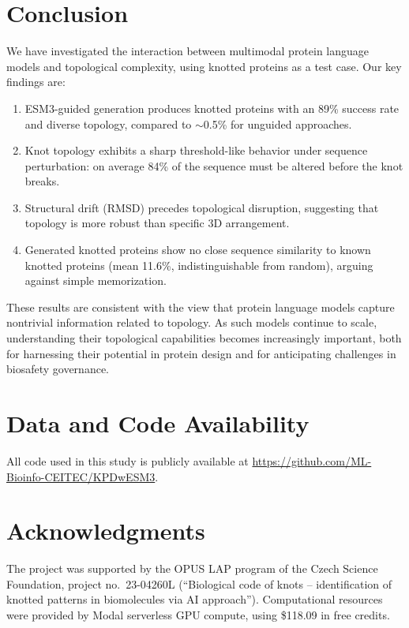 \documentclass{article}
\begin{document}
\section{Conclusion}

We have investigated the interaction between multimodal protein language models and topological complexity, using knotted proteins as a test case. Our key findings are:

\begin{enumerate}
    \item ESM3-guided generation produces knotted proteins with an 89\% success rate and diverse topology, compared to $\sim$0.5\% for unguided approaches.
    \item Knot topology exhibits a sharp threshold-like behavior under sequence perturbation: on average 84\% of the sequence must be altered before the knot breaks.
    \item Structural drift (RMSD) precedes topological disruption, suggesting that topology is more robust than specific 3D arrangement.
    \item Generated knotted proteins show no close sequence similarity to known knotted proteins (mean 11.6\%, indistinguishable from random), arguing against simple memorization.
\end{enumerate}

These results are consistent with the view that protein language models capture nontrivial information related to topology. As such models continue to scale, understanding their topological capabilities becomes increasingly important, both for harnessing their potential in protein design and for anticipating challenges in biosafety governance.

\section*{Data and Code Availability}
All code used in this study is publicly available at \url{https://github.com/ML-Bioinfo-CEITEC/KPDwESM3}. 

\section*{Acknowledgments}
The project was supported by the OPUS LAP program of the Czech Science Foundation, project no.\ 23-04260L (``Biological code of knots -- identification of knotted patterns in biomolecules via AI approach''). Computational resources were provided by Modal serverless GPU compute, using \$118.09 in free credits.
\end{document}
